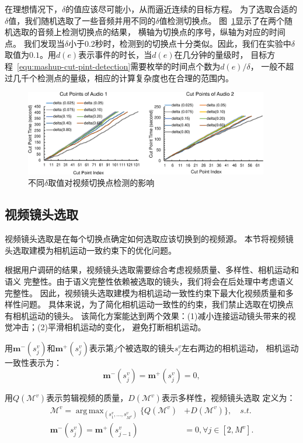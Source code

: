 \documentclass[doctor]{ustcthesis}
\def \m {\mathbf{m}}
\DeclareMathOperator*{\argmax}{arg\,max}
\begin{document}
在理想情况下，$\delta$的值应该尽可能小，从而逼近连续的目标方程。
为了选取合适的$\delta$值，我们随机选取了一些音频并用不同的$\delta$值检测切换点。
图~\ref{fig:mashup-cut-point}显示了在两个随机选取的音频上检测切换点的结果，
横轴为切换点的序号，纵轴为对应的时间点。
我们发现当$\delta$小于$0.2$秒时，检测到的切换点十分类似。因此，我们在实验中$\delta$
取值为$0.1$。用$d(e)$表示事件的时长，当$d(e)$在几分钟的量级时，
目标方程~\eqref{equ:mashup-cut-pint-detection}需要枚举的时间点个数为$d(e)/\delta$，
一般不超过几千个检测点的量级，相应的计算复杂度也在合理的范围内。
\begin{figure}[t]
    \centering
    \includegraphics[clip=true, width=0.95\textwidth]{mashup-cut-point.pdf}
    \caption{不同$\delta$取值对视频切换点检测的影响}
    \label{fig:mashup-cut-point}
\end{figure}

\subsection{视频镜头选取}
视频镜头选取是在每个切换点确定如何选取应该切换到的视频源。
本节将视频镜头选取建模为相机运动一致约束下的优化问题。

根据用户调研的结果，视频镜头选取需要综合考虑视频质量、多样性、相机运动和语义
完整性。由于语义完整性依赖被选取的镜头，我们将会在后处理中考虑语义完整性。
因此，视频镜头选取建模为相机运动一致性约束下最大化视频质量和多样性问题。
具体来说，为了简化相机运动一致性的约束，我们禁止选取在切换点有相机运动的镜头。
该简化方案能达到两个效果：(1)减小连接运动镜头带来的视觉冲击；(2)平滑相机运动的变化，
避免打断相机运动。

用$\m^-(s_j^v)$和$\m^+(s_j^v)$表示第$j$个被选取的镜头$s_j^v$左右两边的相机运动，
相机运动一致性表示为：
\begin{equation}
    \m^-(s_j^v) = \m^+(s_{j}^v) = 0,
\end{equation}

用$Q(\mathcal{M}^v)$表示剪辑视频的质量，$D(\mathcal{M}^v)$表示多样性，视频镜头选取
定义为：
\begin{equation}
    \begin{aligned}
        \mathcal{M}^v = \argmax_{(s_1^v, \ldots, s_{M^v}^v)}\big\{Q(\mathcal{M}^v)& + D(\mathcal{M}^v)\big\}, \quad s.t. \\
        \m^-(s_j^v) = \m^+(s_{j - 1}^v) &= 0, \forall j \in [2,M^v].
    \end{aligned}
    \label{equ:mashup-formu-vss}
\end{equation}
\end{document}
